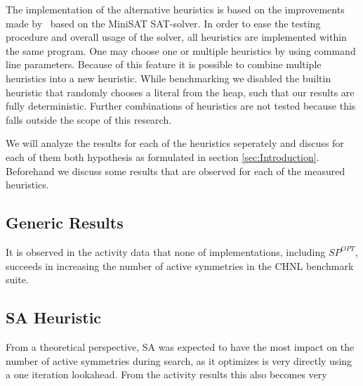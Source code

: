 The implementation of the alternative heuristics is based on the improvements
made by~\cite{devriendt2012symmetry} based on the MiniSAT SAT-solver.
In order to ease the testing procedure and overall usage of the solver, all heuristics
are implemented within the same program. One may choose one or multiple heuristics
by using command line parameters. Because of this feature it is possible to combine
multiple heuristics into a new heuristic.
While benchmarking we disabled the builtin heuristic that randomly chooses a literal from the heap,
such that our results are fully deterministic.
Further combinations of heuristics are not tested because this falls outside the scope
of this research.

We will analyze the results for each of the heuristics seperately and discuss for each of them both
hypothesis as formulated in section \ref{sec:Introduction}.
Beforehand we discuss some results that are observed for each of the measured heuristics.

\subsection{Generic Results}
	It is observed in the activity data that none of implementations, including $SP^{OPT}$,
	succeeds in increasing the number of active symmetries in the CHNL benchmark suite.

\subsection{SA Heuristic}
	From a theoretical perspective, SA was expected to have the most impact on the number of active
	symmetries during search, as it optimizes is very directly using a one iteration lookahead.
	From the activity results this also becomes very
